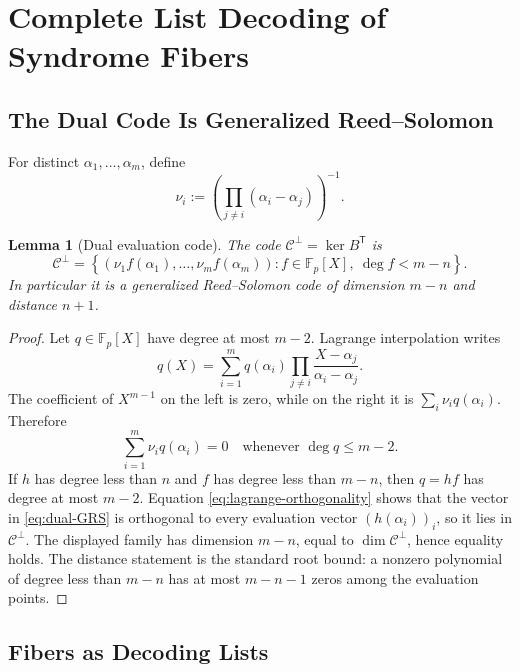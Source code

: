 \documentclass[11pt,letterpaper]{article}
\newtheorem{lemma}[theorem]{Lemma}
\theoremstyle{definition}
\newcommand{\F}{\mathbb{F}}
\newcommand{\C}{\mathcal{C}}
\begin{document}
\section{Complete List Decoding of Syndrome Fibers}

\subsection{The Dual Code Is Generalized Reed--Solomon}

For distinct $\alpha_1,\ldots,\alpha_m$, define
\begin{equation}
   \nu_i:=\left(\prod_{j\ne i}(\alpha_i-\alpha_j)\right)^{-1}.
   \label{eq:dual-multipliers}
\end{equation}

\begin{lemma}[Dual evaluation code]
\label{lem:dual-GRS}
The code $\C^\perp=\ker B^{\mathsf T}$ is
\begin{equation}
   \C^\perp
   =\left\{(\nu_1f(\alpha_1),\ldots,\nu_mf(\alpha_m)):
       f\in\F_p[X],\ \deg f<m-n\right\}.
   \label{eq:dual-GRS}
\end{equation}
In particular it is a generalized Reed--Solomon code of dimension $m-n$ and distance $n+1$.
\end{lemma}

\begin{proof}
Let $q\in\F_p[X]$ have degree at most $m-2$.  Lagrange interpolation writes
\[
   q(X)=\sum_{i=1}^m q(\alpha_i)
        \prod_{j\ne i}\frac{X-\alpha_j}{\alpha_i-\alpha_j}.
\]
The coefficient of $X^{m-1}$ on the left is zero, while on the right it is
$\sum_i\nu_iq(\alpha_i)$.  Therefore
\begin{equation}
   \sum_{i=1}^m\nu_iq(\alpha_i)=0
   \quad\text{whenever }\deg q\le m-2.
   \label{eq:lagrange-orthogonality}
\end{equation}
If $h$ has degree less than $n$ and $f$ has degree less than $m-n$, then $q=hf$ has degree at most $m-2$.  Equation \eqref{eq:lagrange-orthogonality} shows that the vector in \cref{eq:dual-GRS} is orthogonal to every evaluation vector $(h(\alpha_i))_i$, so it lies in $\C^\perp$.  The displayed family has dimension $m-n$, equal to $\dim\C^\perp$, hence equality holds.  The distance statement is the standard root bound: a nonzero polynomial of degree less than $m-n$ has at most $m-n-1$ zeros among the evaluation points.
\end{proof}

\subsection{Fibers as Decoding Lists}
\end{document}
